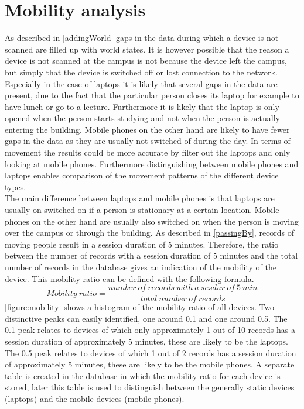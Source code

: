 \section{Mobility analysis}\label{mobility}
As described in \autoref{addingWorld} gaps in the data during which a device is not scanned are filled up with world states. It is however possible that the reason a device is not scanned at the campus is not because the device left the campus, but simply that the device is switched off or lost connection to the network. Especially in the case of laptops it is likely that several gaps in the data are present, due to the fact that the particular person closes its laptop for example to have lunch or go to a lecture. Furthermore it is likely that the laptop is only opened when the person starts studying and not when the person is actually entering the building. Mobile phones on the other hand are likely to have fewer gaps in the data as they are usually not switched of during the day. In terms of movement the results could be more accurate by filter out the laptops and only looking at mobile phones. Furthermore distinguishing between mobile phones and laptops enables comparison of the movement patterns of the different device types. 
\\
The main difference between laptops and mobile phones is that laptops are usually on switched on if a person is stationary at a certain location. Mobile phones on the other hand are usually also switched on when the person is moving over the campus or through the building. As described in  \autoref{passingBy}, records of moving people result in a session duration of 5 minutes. Therefore, the ratio between the number of records with a session duration of 5 minutes and the total number of records in the database gives an indication of the mobility of the device. This mobility ratio can be defined with the following formula.
\[
    Mobility\ ratio = \frac{number\ of\ records\ with\ a\ sesdur\ of\ 5\ min}{total\ number\ of\ records}
\]   
\autoref{figure:mobility} shows a histogram of the mobility ratio of all devices. Two distinctive peaks can easily identified, one around 0.1 and one around 0.5. The 0.1 peak relates to devices of which only approximately 1 out of 10 records has a session duration of approximately 5 minutes, these are likely to be the laptops. The 0.5 peak relates to devices of which 1 out of 2 records has a session duration of approximately 5 minutes, these are likely to be the mobile phones. A separate table is created in the database in which the mobility ratio for each device is stored, later this table is used to distinguish between the generally static devices (laptops) and the mobile devices (mobile phones). 

